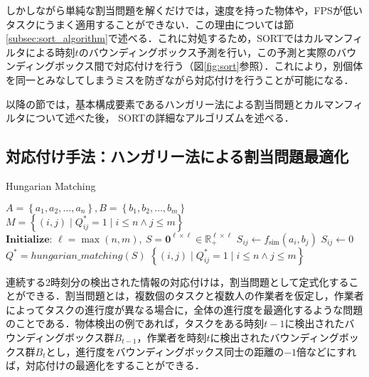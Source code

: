     しかしながら単純な割当問題を解くだけでは，速度を持った物体や，FPSが低いタスクにうまく適用することができない．この理由については節\ref{subsec:sort_algorithm}で述べる．これに対処するため，SORTではカルマンフィルタによる時刻$t$のバウンディングボックス予測を行い，この予測と実際のバウンディングボックス間で対応付けを行う（図\ref{fig:sort}参照）．これにより，別個体を同一とみなしてしまうミスを防ぎながら対応付けを行うことが可能になる．

    以降の節では，基本構成要素であるハンガリー法による割当問題とカルマンフィルタについて述べた後， SORTの詳細なアルゴリズムを述べる．

    \subsection{対応付け手法：ハンガリー法による割当問題最適化}
    \label{subsec:hungarian_algorithm}

    \begin{algorithm}[t]
        \caption{Hungarian Matching}
        \label{alg:hungarian_matching}
        \begin{algorithmic}[1]
            \Require $A = \left\{a_1, a_2, \dots, a_n\right\}, B = \left\{b_1, b_2, \dots, b_m\right\}$
            \Ensure $M = \left\{(i, j) \mid Q^*_{ij} = 1 \mid i \leq n \land j \leq m\right\}$
            \State $\textbf{Initialize: } \ell = \max(n, m), ~ S = \bm{0}^{\ell \times \ell} \in \mathbb{R}_+^{\ell \times \ell}$
                        \State $S_{ij} \gets f_{\text{sim}}(a_i, b_j)$
                    \Else
                        \State $S_{ij} \gets 0$
                    \EndIf
                \EndFor
            \EndFor
            \State $Q^* = hungarian\_matching(S)$
            \State \Return $\left\{(i, j) \mid Q^*_{ij} = 1 \mid i \leq n \land j \leq m\right\}$
        \end{algorithmic}
    \end{algorithm}

    連続する2時刻分の検出された情報の対応付けは，割当問題として定式化することができる．割当問題とは，複数個のタスクと複数人の作業者を仮定し，作業者によってタスクの進行度が異なる場合に，全体の進行度を最適化するような問題のことである．物体検出の例であれば，タスクをある時刻$t-1$に検出されたバウンディングボックス群$B_{t-1}$，作業者を時刻$t$に検出されたバウンディングボックス群$B_{t}$とし，進行度をバウンディングボックス同士の距離の$-1$倍などにすれば，対応付けの最適化をすることができる．

